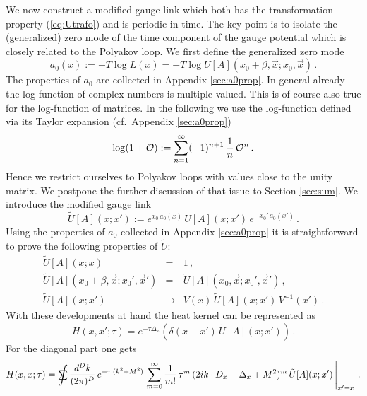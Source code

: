 \documentclass[a4paper,showpacs,showkeys,prd,nofootinbib]{revtex4}
\newcommand{\sumint}{\hbox{$\sum$}\!\!\!\!\!\!\!\int }
\begin{document}
We now construct a modified
gauge link which both has the transformation property (\ref{eq:Utrafo}) and is periodic 
in time. The key point is to isolate the
(generalized) zero mode of the time component of the gauge potential which is closely
related to the Polyakov loop. We first define the generalized zero mode
\begin{equation}
  \label{eq:defa0}
a_0(x) := -T \log L(x) 
= -T \log U[A](x_0+\beta,\vec x;x_0,\vec x)   \,.
\end{equation}
The properties of $a_0$ are collected in Appendix \ref{sec:a0prop}. In general
already the log-function of complex numbers is multiple valued. This is of course
also true for the log-function of matrices.
In the following we use the log-function defined
via its Taylor expansion (cf.~Appendix \ref{sec:a0prop})
\begin{equation}
  \label{eq:deflog}
\log (1+{\cal O}) := 
\sum\limits_{n=1}^\infty (-1)^{n+1} \, {1 \over n} \, {\cal O}^n   \,.
\end{equation}
Hence we restrict ourselves to Polyakov loops with values close to the unity matrix.
We postpone the further discussion of that
issue to Section \ref{sec:sum}. We introduce the modified gauge link
\begin{equation}
  \label{eq:modgaugeconn}
\tilde U[A](x;x') := e^{x_0 \, a_0(x)} \, U[A](x;x') \, e^{-x_0' \, a_0(x')}  \,.
\end{equation}
Using the properties of $a_0$ collected in Appendix \ref{sec:a0prop}
it is straightforward to prove the following properties of $\tilde U$:
\begin{subequations}
\begin{eqnarray}
  \label{eq:propUtilde1}
\tilde U[A](x;x) & = & 1 \,,
\\
\tilde U[A](x_0+\beta,\vec x;x_0',\vec x') & = & \tilde U[A](x_0,\vec x;x_0',\vec x') 
\,, \\
\tilde U[A](x;x') & \to & V(x)\, \tilde U[A](x;x')  \, V^{-1}(x')  \,.
\end{eqnarray}
\end{subequations}
With these developments at hand the heat kernel can be represented as
\begin{equation}
  \label{eq:heatgaugecov}
H(x,x';\tau) = e^{-\tau \Delta_x} \left( \delta(x-x') \, \tilde U[A](x;x') \right) \,.
\end{equation}
For the diagonal part one gets
\begin{equation}
  \label{eq:diagheatgaugecov}
H(x,x;\tau) = \sumint {d^{D}k \over (2 \pi)^{D}} \, e^{-\tau \, (k^2+M^2)}
\left. 
\sum\limits_{m=0}^\infty {1 \over m!} \, \tau^m \, (2 i k \cdot D_x - \Delta_x + M^2)^m
\, \tilde U[A](x;x') \, \right\vert_{x' = x}  \,.
\end{equation}
\end{document}
